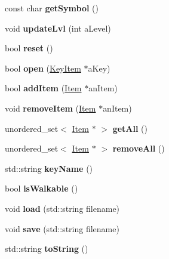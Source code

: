 \begin{DoxyCompactItemize}
\item 
\hypertarget{class_chest_a42b87228cbd720ca3e6bbe54a72cd3ee}{}\label{class_chest_a42b87228cbd720ca3e6bbe54a72cd3ee} 
const char {\bfseries get\+Symbol} ()
\item 
\hypertarget{class_chest_aa6c95831a0e55155c917323f7bd24249}{}\label{class_chest_aa6c95831a0e55155c917323f7bd24249} 
void {\bfseries update\+Lvl} (int a\+Level)
\item 
\hypertarget{class_chest_ac14bf4adcd35db79f8cd018aaffb2bab}{}\label{class_chest_ac14bf4adcd35db79f8cd018aaffb2bab} 
bool {\bfseries reset} ()
\item 
\hypertarget{class_chest_a2ae8e14e58fb1b50214935057b7cb103}{}\label{class_chest_a2ae8e14e58fb1b50214935057b7cb103} 
bool {\bfseries open} (\hyperlink{class_key_item}{Key\+Item} $\ast$a\+Key)
\item 
\hypertarget{class_chest_a6bed6abc28230857fae972d1502e4439}{}\label{class_chest_a6bed6abc28230857fae972d1502e4439} 
bool {\bfseries add\+Item} (\hyperlink{class_item}{Item} $\ast$an\+Item)
\item 
\hypertarget{class_chest_a72987b964c8616fdc74344a9d9f8d095}{}\label{class_chest_a72987b964c8616fdc74344a9d9f8d095} 
void {\bfseries remove\+Item} (\hyperlink{class_item}{Item} $\ast$an\+Item)
\item 
\hypertarget{class_chest_ae4663c7ab039a1a13a39c1c9ab7e3ac9}{}\label{class_chest_ae4663c7ab039a1a13a39c1c9ab7e3ac9} 
unordered\+\_\+set$<$ \hyperlink{class_item}{Item} $\ast$ $>$ {\bfseries get\+All} ()
\item 
\hypertarget{class_chest_a0a3e28a480606f1a650a34043992f880}{}\label{class_chest_a0a3e28a480606f1a650a34043992f880} 
unordered\+\_\+set$<$ \hyperlink{class_item}{Item} $\ast$ $>$ {\bfseries remove\+All} ()
\item 
\hypertarget{class_chest_a0a10f9b5a9ec421f6f3756b39edc92b9}{}\label{class_chest_a0a10f9b5a9ec421f6f3756b39edc92b9} 
std\+::string {\bfseries key\+Name} ()
\item 
\hypertarget{class_chest_a263bdda01679de8aa3fef71036d33b2a}{}\label{class_chest_a263bdda01679de8aa3fef71036d33b2a} 
bool {\bfseries is\+Walkable} ()
\item 
\hypertarget{class_chest_a956e975682338b63e5f51b975c9707d4}{}\label{class_chest_a956e975682338b63e5f51b975c9707d4} 
void {\bfseries load} (std\+::string filename)
\item 
\hypertarget{class_chest_a0a0077543c751d68acd1130845561559}{}\label{class_chest_a0a0077543c751d68acd1130845561559} 
void {\bfseries save} (std\+::string filename)
\item 
\hypertarget{class_chest_a54b773b175e8961c0dca87409a96507b}{}\label{class_chest_a54b773b175e8961c0dca87409a96507b} 
std\+::string {\bfseries to\+String} ()
\end{DoxyCompactItemize}
